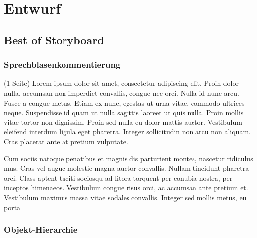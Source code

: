 \chapter{Entwurf}
\label{chap:entwurf}




\clearpage



\clearpage



\clearpage

\section{Best of Storyboard}
\label{sec:bestof}

\subsection{Sprechblasenkommentierung}
\label{sec:sprechblasenkommentierung}

(1 Seite)
Lorem ipsum dolor sit amet, consectetur adipiscing elit. Proin dolor nulla, accumsan non imperdiet convallis, congue nec orci. Nulla id nunc arcu. Fusce a congue metus. Etiam ex nunc, egestas ut urna vitae, commodo ultrices neque. Suspendisse id quam ut nulla sagittis laoreet ut quis nulla. Proin mollis vitae tortor non dignissim. Proin sed nulla eu dolor mattis auctor. Vestibulum eleifend interdum ligula eget pharetra. Integer sollicitudin non arcu non aliquam. Cras placerat ante at pretium vulputate.

Cum sociis natoque penatibus et magnis dis parturient montes, nascetur ridiculus mus. Cras vel augue molestie magna auctor convallis. Nullam tincidunt pharetra orci. Class aptent taciti sociosqu ad litora torquent per conubia nostra, per inceptos himenaeos. Vestibulum congue risus orci, ac accumsan ante pretium et. Vestibulum maximus massa vitae sodales convallis. Integer sed mollis metus, eu porta

\clearpage
\subsection{Objekt-Hierarchie}
\label{sec:objekthierarchie}



